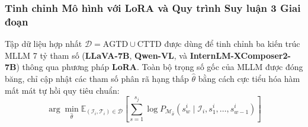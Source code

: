 \documentclass[conference,10pt]{IEEEtran}
\begin{document}
\subsubsection{Tinh chỉnh Mô hình với LoRA và Quy trình Suy luận 3 Giai đoạn}

Tập dữ liệu hợp nhất $\mathcal{D} = \text{AGTD} \cup \text{CTTD}$ được dùng để tinh chỉnh ba kiến trúc MLLM 7 tỷ tham số (\textbf{LLaVA-7B}, \textbf{Qwen-VL}, và \textbf{InternLM-XComposer2-7B}) thông qua phương pháp \textbf{LoRA}. Toàn bộ trọng số gốc của MLLM được đóng băng, chỉ cập nhật các tham số phân rã hạng thấp $\hat{\theta}$ bằng cách cực tiểu hóa hàm mất mát tự hồi quy tiêu chuẩn:
\begin{equation}
    \arg\min_{\hat{\theta}} \mathbb{E}_{(\mathcal{I}_i, \mathcal{T}_i) \in \mathcal{D}} \left[ \sum_{s=1}^{s_j} \log P_{\mathcal{M}_{\hat{\theta}}} \left( s_w^i \mid \mathcal{I}_i, s_1^i, \dots, s_{w-1}^i \right) \right]
    \label{eq:msit_loss}
\end{equation}
\end{document}
